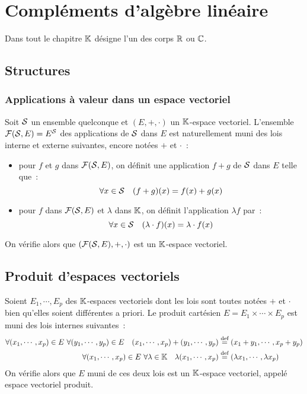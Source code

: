 \addtocounter{chapter}{-2}
\chapter{Compléments d'algèbre linéaire}
\minitoc
\minilof
\minilot

Dans tout le chapitre $\K$ désigne l'un des corps $\R$ ou $\C$.
\section{Structures}
\subsection{Applications à valeur dans un espace vectoriel}
Soit $\S$ un ensemble quelconque et $(E,+,\cdot)$ un $\K$-espace vectoriel. L'ensemble $\F(\S,E) = E^{\S}$ des applications de $\S$ dans $E$ est naturellement muni des lois interne et externe suivantes, encore notées $+$ et $\cdot$~:
\begin{itemize}
	\item pour $f$ et $g$ dans $\F(\S,E)$, on définit une application $f+g$ de $\S$ dans $E$ telle que~:
	\begin{equation}
		\forall x \in \S \quad (f+g)(x) = f(x)+g(x)
	\end{equation}
	\item pour $f$ dans $\F(\S,E)$ et $\lambda$ dans $\K$, on définit l'application $\lambda f$ par~:
	\begin{equation}
		\forall x \in \S \quad (\lambda \cdot f)(x) = \lambda \cdot f(x)
	\end{equation}
\end{itemize}
On vérifie alors que $(\F(\S,E), +, \cdot)$ est un $\K$-espace vectoriel.
\section{Produit d'espaces vectoriels}
Soient $E_1, \cdots, E_p$ des $\K$-espaces vectoriels dont les lois sont toutes notées $+$ et $\cdot$ bien qu'elles soient différentes a priori. Le produit cartésien $E = E_1 \times \cdots \times E_p$ est muni des lois internes suivantes~:
\begin{align}
	\forall (x_1, \cdots, x_p) \in E \ \forall (y_1, \cdots, y_p) \in E \quad (x_1, \cdots, x_p) + (y_1, \cdots, y_p) &\overset{\text{def}}{=} (x_1+y_1, \cdots, x_p+y_p) \\
	\forall (x_1, \cdots, x_p) \in E \ \forall \lambda \in \K \quad \lambda (x_1, \cdots, x_p) &\overset{\text{def}}{=} (\lambda x_1, \cdots, \lambda x_p)
\end{align}
On vérifie alors que $E$ muni de ces deux lois est un $\K$-espace vectoriel, appelé espace vectoriel produit.
